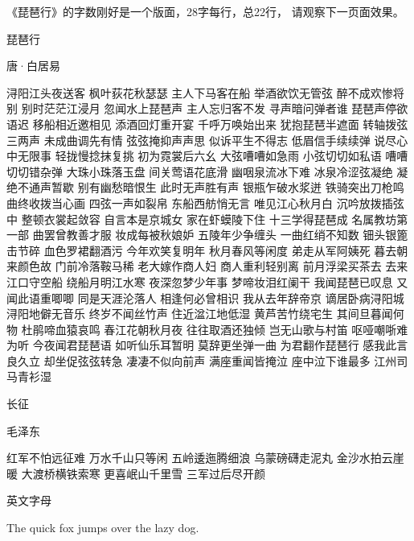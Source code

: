 \documentclass{article}
\begin{document}
\renewcommand{\headrulewidth}{1mm}
\renewcommand{\footrulewidth}{1mm}



\the\topskip
\vfill
《琵琶行》的字数刚好是一个版面，28字每行，总22行，
请观察下一页面效果。
\begin{center}
琵\quad 琶\quad 行

唐·白居易
\end{center}
\newpage
\noindent%
浔阳江头夜送客 枫叶荻花秋瑟瑟
主人下马客在船 举酒欲饮无管弦%
醉不成欢惨将别 别时茫茫江浸月
%
忽闻水上琵琶声 主人忘归客不发%
寻声暗问弹者谁 琵琶声停欲语迟
移船相近邀相见 添酒回灯重开宴%
千呼万唤始出来 犹抱琵琶半遮面
转轴拨弦三两声 未成曲调先有情%
弦弦掩抑声声思 似诉平生不得志
低眉信手续续弹 说尽心中无限事%
轻拢慢捻抹复挑 初为霓裳后六幺
大弦嘈嘈如急雨 小弦切切如私语%
嘈嘈切切错杂弹 大珠小珠落玉盘
间关莺语花底滑 幽咽泉流冰下难%
冰泉冷涩弦凝绝 凝绝不通声暂歇
别有幽愁暗恨生 此时无声胜有声%
银瓶乍破水浆迸 铁骑突出刀枪鸣
曲终收拨当心画 四弦一声如裂帛%
东船西舫悄无言 唯见江心秋月白
%
沉吟放拨插弦中 整顿衣裳起敛容%
自言本是京城女 家在虾蟆陵下住
十三学得琵琶成 名属教坊第一部%
曲罢曾教善才服 妆成每被秋娘妒
五陵年少争缠头 一曲红绡不知数%
钿头银篦击节碎 血色罗裙翻酒污
今年欢笑复明年 秋月春风等闲度%
弟走从军阿姨死 暮去朝来颜色故
门前冷落鞍马稀 老大嫁作商人妇%
商人重利轻别离 前月浮梁买茶去
去来江口守空船 绕船月明江水寒%
夜深忽梦少年事 梦啼妆泪红阑干
%
我闻琵琶已叹息 又闻此语重唧唧%
同是天涯沦落人 相逢何必曾相识
我从去年辞帝京 谪居卧病浔阳城%
浔阳地僻无音乐 终岁不闻丝竹声
住近湓江地低湿 黄芦苦竹绕宅生%
其间旦暮闻何物 杜鹃啼血猿哀鸣
春江花朝秋月夜 往往取酒还独倾%
岂无山歌与村笛 呕哑嘲哳难为听
今夜闻君琵琶语 如听仙乐耳暂明%
莫辞更坐弹一曲 为君翻作琵琶行
感我此言良久立 却坐促弦弦转急%
凄凄不似向前声 满座重闻皆掩泣
座中泣下谁最多 江州司马青衫湿%


\begin{center}
长\qquad\qquad 征

毛泽东

红军不怕远征难 万水千山只等闲
五岭逶迤腾细浪 乌蒙磅礴走泥丸
金沙水拍云崖暖 大渡桥横铁索寒
更喜岷山千里雪 三军过后尽开颜
  
\end{center}

\vfill
英文字母

The quick fox jumps over the lazy dog.
\end{document}
